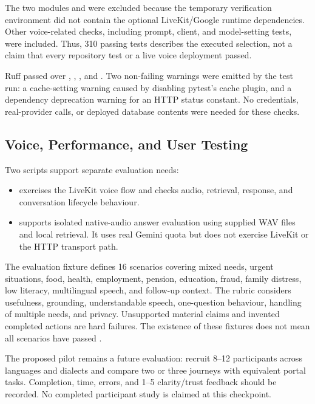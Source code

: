 \documentclass[11pt,a4paper,oneside]{report}
\newcommand{\code}[1]{\texttt{\detokenize{#1}}}
\begin{document}
The two modules  and
 were excluded because the temporary verification
environment did not contain the optional LiveKit/Google runtime dependencies.
Other voice-related checks, including prompt, client, and model-setting tests,
were included. Thus, 310 passing tests describes the executed selection, not a
claim that every repository test or a live voice deployment passed.

Ruff passed over \code{app}, \code{tests}, \code{scripts}, and \code{alembic}.
Two non-failing warnings were emitted by the test run: a cache-setting warning
caused by disabling pytest's cache plugin, and a dependency deprecation warning
for an HTTP status constant. No credentials, real-provider calls, or deployed
database contents were needed for these checks.

\subsection{Voice, Performance, and User Testing}
Two scripts support separate evaluation needs:
\begin{itemize}
  \item {} exercises the LiveKit voice flow and checks
    audio, retrieval, response, and conversation lifecycle behaviour.
  \item {} supports isolated native-audio
    answer evaluation using supplied WAV files and local retrieval. It uses real
    Gemini quota but does not exercise LiveKit or the HTTP transport path.
\end{itemize}

The evaluation fixture defines 16 scenarios covering mixed needs, urgent
situations, food, health, employment, pension, education, fraud, family distress,
low literacy, multilingual speech, and follow-up context. The rubric considers
usefulness, grounding, understandable speech, one-question behaviour, handling
of multiple needs, and privacy. Unsupported material claims and invented completed
actions are hard failures. The existence of these fixtures does not mean all
scenarios have passed \cite{evaluation-fixtures}.

The proposed pilot remains a future evaluation: recruit 8--12 participants across
languages and dialects and compare two or three journeys with equivalent portal
tasks. Completion, time, errors, and 1--5 clarity/trust feedback should be recorded.
No completed participant study is claimed at this checkpoint.
\end{document}
